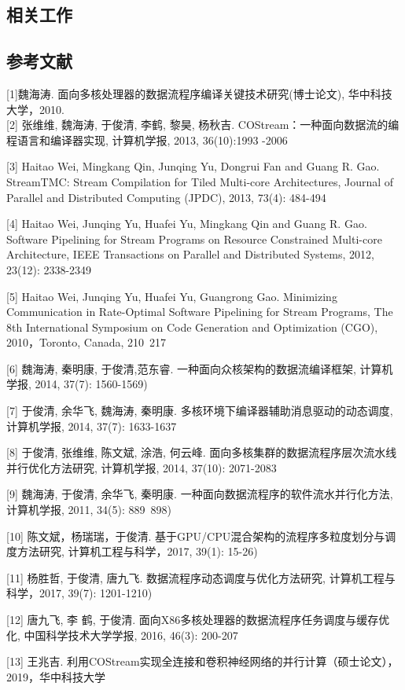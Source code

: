 \subsection{相关工作}

\subsection{参考文献}
[1]魏海涛. 面向多核处理器的数据流程序编译关键技术研究(博士论文), 华中科技大学，2010.\\

[2] 张维维, 魏海涛, 于俊清, 李鹤, 黎昊, 杨秋吉. COStream：一种面向数据流的编程语言和编译器实现, 计算机学报, 2013, 36(10):1993 -2006

[3] Haitao Wei, Mingkang Qin, Junqing Yu, Dongrui Fan and Guang R. Gao. StreamTMC: Stream Compilation for Tiled Multi-core Architectures, Journal of Parallel and Distributed Computing (JPDC), 2013, 73(4): 484-494

[4] Haitao Wei, Junqing Yu, Huafei Yu, Mingkang Qin and Guang R. Gao. Software Pipelining for Stream Programs on Resource Constrained Multi-core Architecture, IEEE Transactions on Parallel and Distributed Systems, 2012, 23(12): 2338-2349

[5] Haitao Wei, Junqing Yu, Huafei Yu, Guangrong Gao. Minimizing Communication in Rate-Optimal Software Pipelining for Stream Programs, The 8th International Symposium on Code Generation and Optimization (CGO), 2010，Toronto, Canada, 210~217

[6] 魏海涛, 秦明康, 于俊清,范东睿. 一种面向众核架构的数据流编译框架, 计算机学报, 2014, 37(7): 1560-1569)

[7] 于俊清, 余华飞, 魏海涛, 秦明康. 多核环境下编译器辅助消息驱动的动态调度, 计算机学报, 2014, 37(7): 1633-1637

[8] 于俊清, 张维维, 陈文斌, 涂浩, 何云峰. 面向多核集群的数据流程序层次流水线并行优化方法研究, 计算机学报, 2014, 37(10): 2071-2083

[9] 魏海涛, 于俊清, 余华飞, 秦明康. 一种面向数据流程序的软件流水并行化方法, 计算机学报, 2011, 34(5): 889~898)

[10] 陈文斌，杨瑞瑞，于俊清. 基于GPU/CPU混合架构的流程序多粒度划分与调度方法研究, 计算机工程与科学，2017, 39(1): 15-26)

[11] 杨胜哲, 于俊清, 唐九飞. 数据流程序动态调度与优化方法研究, 计算机工程与科学，2017, 39(7): 1201-1210)

[12] 唐九飞, 李 鹤, 于俊清. 面向X86多核处理器的数据流程序任务调度与缓存优化, 中国科学技术大学学报, 2016, 46(3): 200-207

[13] 王兆吉. 利用COStream实现全连接和卷积神经网络的并行计算（硕士论文），2019，华中科技大学